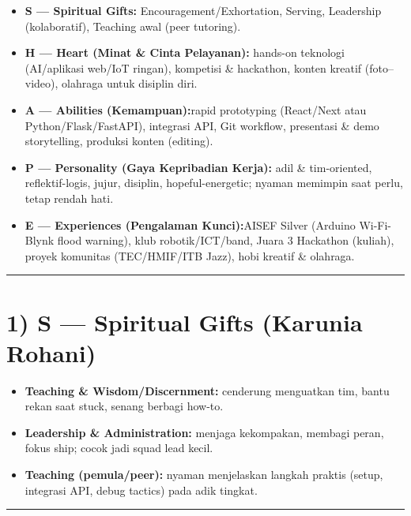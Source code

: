 \documentclass[
  letterpaper,
  DIV=11,
  numbers=noendperiod]{scrreprt}
\providecommand{\tightlist}{%
  \setlength{\itemsep}{0pt}\setlength{\parskip}{0pt}}
\begin{document}
\begin{itemize}
\tightlist
\item
  \textbf{S --- Spiritual Gifts:} Encouragement/Exhortation, Serving,
  Leadership (kolaboratif), Teaching awal (peer tutoring).
\item
  \textbf{H --- Heart (Minat \& Cinta Pelayanan):} hands-on teknologi
  (AI/aplikasi web/IoT ringan), kompetisi \& hackathon, konten kreatif
  (foto--video), olahraga untuk disiplin diri.
\item
  \textbf{A --- Abilities (Kemampuan):}rapid prototyping (React/Next
  atau Python/Flask/FastAPI), integrasi API, Git workflow, presentasi \&
  demo storytelling, produksi konten (editing).
\item
  \textbf{P --- Personality (Gaya Kepribadian Kerja):} adil \&
  tim-oriented, reflektif-logis, jujur, disiplin, hopeful-energetic;
  nyaman memimpin saat perlu, tetap rendah hati.
\item
  \textbf{E --- Experiences (Pengalaman Kunci):}AISEF Silver (Arduino
  Wi-Fi-Blynk flood warning), klub robotik/ICT/band, Juara 3 Hackathon
  (kuliah), proyek komunitas (TEC/HMIF/ITB Jazz), hobi kreatif \&
  olahraga.
\end{itemize}

\begin{center}\rule{0.5\linewidth}{0.5pt}\end{center}

\section{1) S --- Spiritual Gifts (Karunia
Rohani)}\label{s-spiritual-gifts-karunia-rohani}

\begin{itemize}
\tightlist
\item
  \textbf{Teaching \& Wisdom/Discernment:} cenderung menguatkan tim,
  bantu rekan saat stuck, senang berbagi how-to.
\item
  \textbf{Leadership \& Administration:} menjaga kekompakan, membagi
  peran, fokus ship; cocok jadi squad lead kecil.
\item
  \textbf{Teaching (pemula/peer):} nyaman menjelaskan langkah praktis
  (setup, integrasi API, debug tactics) pada adik tingkat.
\end{itemize}

\begin{center}\rule{0.5\linewidth}{0.5pt}\end{center}
\end{document}
